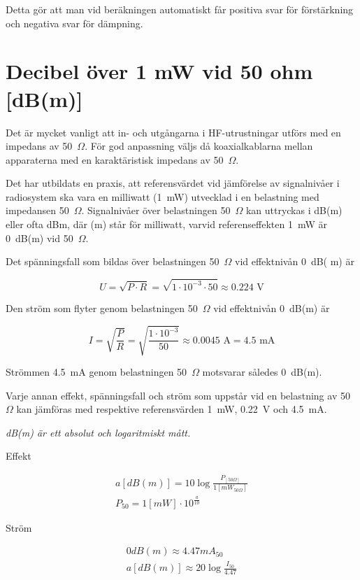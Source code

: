 Detta gör att man vid beräkningen automatiskt får positiva svar för
förstärkning och negativa svar för dämpning.

\section{Decibel över 1 mW vid 50 ohm [dB(m)]}

Det är mycket vanligt att in- och utgångarna i HF-utrustningar utförs
med en impedans av 50~\(\Omega\).
För god anpassning väljs då koaxialkablarna mellan apparaterna med en
karaktäristisk impedans av 50~\(\Omega\).

Det har utbildats en praxis, att referensvärdet vid jämförelse av signalnivåer
i radiosystem ska vara en milliwatt (1~mW) utvecklad i en belastning med
impedansen 50~\(\Omega\).
Signalnivåer över belastningen 50~\(\Omega\) kan uttryckas i dB(m) eller ofta
dBm, där (m) står för milliwatt, varvid referenseffekten 1~mW är 0~dB(m) vid
50~\(\Omega\).

Det spänningsfall som bildas över belastningen 50~\(\Omega\) vid effektnivån
0~dB( m) är

\[U = \sqrt{P\cdot R} = \sqrt{1\cdot 10^{-3} \cdot 50} \approx 0.224 \text{ V}\]

Den ström som flyter genom belastningen 50~\(\Omega\) vid effektnivån 0~dB(m)
är

\[
I = \sqrt{\frac{P}{R}} = \sqrt{\frac{1\cdot 10^{-3}}{50}} \approx 0.0045 \text{ A} = 4.5 \text{ mA}
\]

Strömmen 4.5~mA genom belastningen 50~\(\Omega\) motsvarar således 0~dB(m).

Varje annan effekt, spänningsfall och ström som uppstår vid en
belastning av 50 \(\Omega\) kan jämföras med respektive referensvärden 1~mW,
0.22~V och 4.5~mA.

\emph{dB(m) är ett absolut och logaritmiskt mått.}

Effekt

\begin{gather*}
	a [dB(m)] = 10 \log\frac{P_{[50 \Omega]}}{1[mW_{50 \Omega}]} \\
	P_{50} = 1 [mW] \cdot 10^{\frac{a}{10}}
\end{gather*}

Ström

\begin{gather*}
	0 dB(m) \approx 4.47 mA_{50} \\
	a [dB(m)] \approx 20 \log\frac{I_{50}}{4.47}
\end{gather*}

